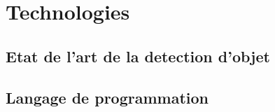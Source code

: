 \chapter{Technologies}

\section{Etat de l'art de la detection d'objet}

\section{Langage de programmation}

\clearpage